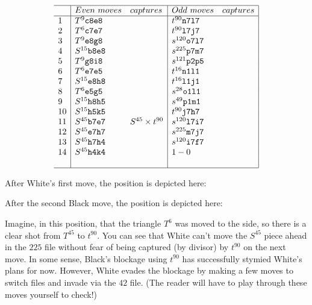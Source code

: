 \documentclass[14pt]{extarticle}
\begin{document}
\[
\begin{array}{l|ll|ll|} \hline
  \quad & Even\ moves & captures & Odd\ moves & captures \\ \hline
  1 & T^9{\tt c8e8} &  & t^{90}{\tt n7l7} &   \\
  2 & T^6{\tt c7e7} &  & t^{90}{\tt l7j7} &   \\
  3 & T^9{\tt e8g8} &  & s^{120}{\tt o7l7} &   \\
  4 & S^{15}{\tt b8e8} &  & s^{225}{\tt p7m7} &   \\
  5 & T^9{\tt g8i8} &  & s^{121}{\tt p2p5} &   \\
  6 & T^6{\tt e7e5} &  & t^{16}{\tt n1l1} &   \\
  7 & S^{15}{\tt e8h8} &  & t^{16}{\tt l1j1} &   \\
  8 & T^6{\tt e5g5} &  & s^{28}{\tt o1l1} &   \\
  9 & S^{15}{\tt h8h5} &  & s^{49}{\tt p1m1} &   \\
  10 & S^{15}{\tt h5k5} &  & t^{90}{\tt j7h7} &   \\
  11 & S^{45}{\tt b7e7} & S^{45}\times t^{90} & s^{120}{\tt l7i7} &   \\
  12 & S^{45}{\tt e7h7} &  & s^{225}{\tt m7j7} &   \\
  13 & S^{45}{\tt h7h4} &  & s^{120}{\tt i7f7} &   \\
  14 & S^{45}{\tt h4k4} &  & 1-0 &   \\
  \quad & \quad & \quad & \quad & \quad \\ \hline
\end{array}
\]

After White's first move, the position is depicted here:

\begin{center}
\end{center}
After the second Black move, the position is depicted here:

\begin{center}
\end{center}
Imagine, in this position, that the triangle $T^6$ was moved to the side, so there is a
clear shot from $T^{45}$ to $t^{90}$. 
You can see that White can't move the $S^{45}$ piece ahead in the {\bf $225$}
file without fear of being captured (by divisor) by $t^{90}$ on the next move.
In some sense, Black's blockage using $t^{90}$ has successfully stymied White's plans for now.
However, White evades the blockage by
making a few moves to switch files and invade via the $42$ file.
(The reader will have to play through these moves yourself to check!)
\end{document}
